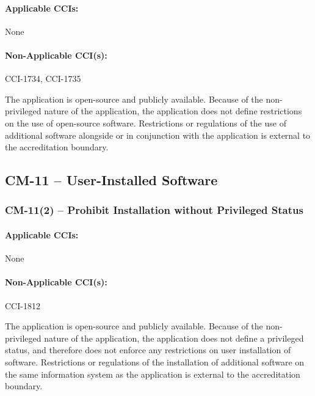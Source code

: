 \documentclass[letterpaper, 10pt, twoside]{article}
\begin{document}
\paragraph{Applicable CCIs:} None

\paragraph{Non-Applicable CCI(s):} CCI-1734, CCI-1735

The application is open-source and publicly available. Because of the non-privileged nature of the application, the application does not define restrictions on the use of open-source software. Restrictions or regulations of the use of additional software alongside or in conjunction with the application is external to the accreditation boundary.

\subsection{CM-11 -- User-Installed Software}

\subsubsection{CM-11(2) -- Prohibit Installation without Privileged Status}

\paragraph{Applicable CCIs:} None

\paragraph{Non-Applicable CCI(s):} CCI-1812

The application is open-source and publicly available. Because of the non-privileged nature of the application, the application does not define a privileged status, and therefore does not enforce any restrictions on user installation of software. Restrictions or regulations of the installation of additional software on the same information system as the application is external to the accreditation boundary.

\clearpage
\printbibliography
\end{document}
